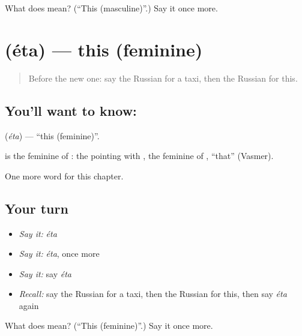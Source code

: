 \begin{tcolorbox}[breakable,colback=teal!4,colframe=teal!35!black,title={Before you move on}]
What does  mean? (\textquotedblleft{}This (masculine)\textquotedblright{}.) Say it once more.
\end{tcolorbox}
\section[\texorpdfstring{\ru{эта} (éta)}{эта (éta)}]{ (éta) — this (feminine)}

\label{lesson:RU-C82-this-2}



\begin{quote}
Before the new one: say the Russian for a taxi, then the Russian for this.
\end{quote}

\subsection*{You'll want to know: }
\textbf{} (\emph{éta}) — \textquotedblleft{}this (feminine)\textquotedblright{}.

\begin{cousinweb}
\textbf{} is the feminine of \emph{}: the pointing \emph{} with \emph{}, the feminine of \emph{}, \textquotedblleft{}that\textquotedblright{} (Vasmer).
\end{cousinweb}

\begin{grammarlens}[title={What you've built}]
One more word for this chapter.
\end{grammarlens}

\subsection*{Your turn}
\begin{itemize}
\raggedright
  \item \emph{Say it:} \emph{éta}
  \item \emph{Say it:} \emph{éta}, once more
  \item \emph{Say it:} say \emph{éta}
  \item \emph{Recall:} say the Russian for a taxi, then the Russian for this, then say \emph{éta} again
\end{itemize}

\begin{tcolorbox}[breakable,colback=teal!4,colframe=teal!35!black,title={Before you move on}]
What does  mean? (\textquotedblleft{}This (feminine)\textquotedblright{}.) Say it once more.
\end{tcolorbox}
